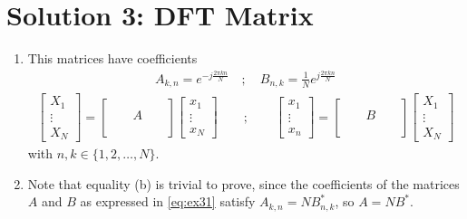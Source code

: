 \documentclass{article}
\begin{document}
\section*{Solution 3: DFT Matrix}
\begin{enumerate}
    \item This matrices have coefficients
    \begin{align}
        A_{k,n}= e^{-j\frac{2\pi kn}{N}} \quad; \quad  B_{n,k}= \frac{1}{N}e^{j\frac{2\pi kn}{N}}
        \label{eq:ex31}
    \end{align}
    \begin{align}
        \begin{bmatrix}
            X_1 \\ \vdots \\ X_N 
        \end{bmatrix}
        =
        \begin{bmatrix}
             & & & & \\
             & & A & & \\
             & & & & \\
        \end{bmatrix}
        \begin{bmatrix}
            x_1 \\ \vdots \\ x_N 
        \end{bmatrix} \qquad ; \qquad 
        \begin{bmatrix}
            x_1 \\ \vdots \\ x_n 
        \end{bmatrix}
        =
        \begin{bmatrix}
             & & & & \\
             & & B & & \\
             & & & & \\
        \end{bmatrix}
        \begin{bmatrix}
            X_1 \\ \vdots \\ X_N
        \end{bmatrix}
    \end{align}
    with $n,k \in \{1,2,\dots,N\}$.
    \item Note that equality (b) is trivial to prove, since the coefficients of the matrices $A$ and $B$ as expressed in \eqref{eq:ex31} satisfy $A_{k,n} = N B_{n,k}^*$, so $A = N B^*$.
    

\end{enumerate}
\end{document}
